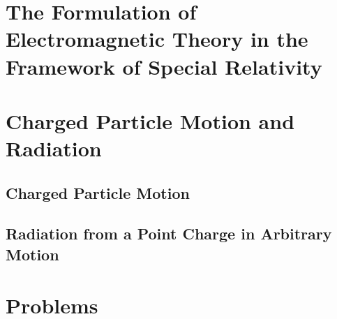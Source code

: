  
 
  
\section{The Formulation of Electromagnetic Theory in the Framework of Special Relativity}\label{sec:8.2}

\section{Charged Particle Motion and Radiation}\label{sec:8.3}

\subsection{Charged Particle Motion}\label{ssec:8.3.1}

\subsection{Radiation from a Point Charge in Arbitrary Motion}\label{ssec:8.3.2}


\section*{Problems}


